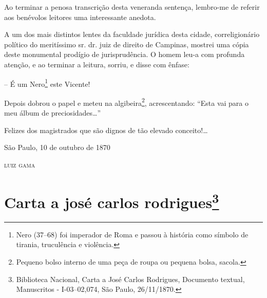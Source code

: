 Ao terminar a penosa transcrição desta veneranda sentença, lembro-me de
referir aos benévolos leitores uma interessante anedota.

A um dos mais distintos lentes da faculdade jurídica desta cidade,
correligionário político do meritíssimo sr. dr. juiz de direito de
Campinas, mostrei uma cópia deste monumental prodígio de jurisprudência.
O homem leu-a com profunda atenção, e ao terminar a leitura, sorriu, e
disse com ênfase:

-- É um Nero\footnote{ Nero (37--68) foi imperador de Roma e passou à
  história como símbolo de tirania, truculência e violência.} este
Vicente!

Depois dobrou o papel e meteu na algibeira\footnote{ Pequeno bolso
  interno de uma peça de roupa ou pequena bolsa, sacola.},
acrescentando: ``Esta vai para o meu álbum de preciosidades\ldots{}''

Felizes dos magistrados que são dignos de tão elevado conceito!\ldots{}

\begin{flushright}
São Paulo, 10 de outubro de 1870

\textsc{luiz gama}
\end{flushright}

\chapter{Carta a josé carlos rodrigues\footnote{Biblioteca Nacional, Carta a José Carlos Rodrigues,
  Documento textual, Manuscritos - I-03--02,074, São Paulo, 26/11/1870.}} %

